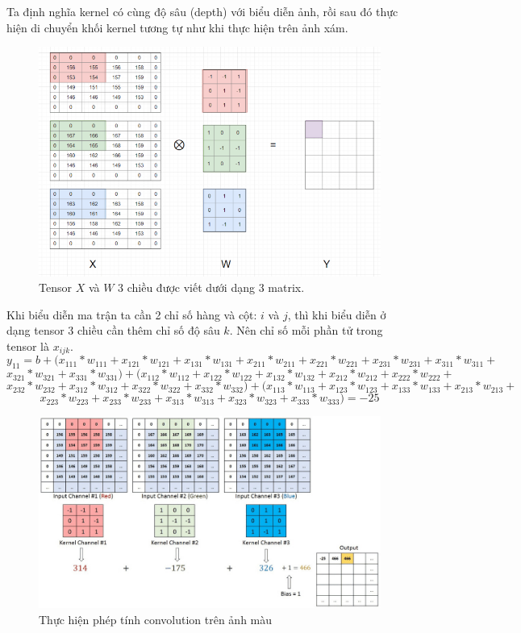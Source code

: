 Ta định nghĩa kernel có cùng độ sâu (depth) với biểu diễn ảnh, rồi sau đó thực hiện di chuyển khối kernel tương tự như khi thực hiện trên ảnh xám.

\FloatBarrier
\begin{figure}[htp]
\begin{center}
\includegraphics[scale=1]{chap2/c2_figs/14.png}
\end{center}
\caption{Tensor $X$ và $W$ 3 chiều được viết dưới dạng 3 matrix.}
\label{fig:padding,stride}
\end{figure}
\FloatBarrier

Khi biểu diễn ma trận ta cần 2 chỉ số hàng và cột: $i$ và $j$, thì khi biểu diễn ở dạng tensor 3 chiều cần thêm chỉ số độ sâu $k$. Nên chỉ số mỗi phần tử trong tensor là $x_{ijk}$.
$$y_{11} = b + (x_{111}*w_{111} +  x_{121}*w_{121} + x_{131}*w_{131} +  x_{211}*w_{211} +  x_{221}*w_{221} +  x_{231}*w_{231} +  x_{311}*w_{311} + $$ $$ x_{321}*w_{321} +  x_{331}*w_{331}) + (x_{112}*w_{112} +  x_{122}*w_{122} + x_{132}*w_{132} +  x_{212}*w_{212} +  x_{222}*w_{222} + $$ $$x_{232}*w_{232} +  x_{312}*w_{312} +  x_{322}*w_{322} +  x_{332}*w_{332}) +  (x_{113}*w_{113} +  x_{123}*w_{123} + x_{133}*w_{133} +  x_{213}*w_{213} + $$ $$ x_{223}*w_{223} +  x_{233}*w_{233} +  x_{313}*w_{313} +  x_{323}*w_{323} +  x_{333}*w_{333}) = -25$$

\FloatBarrier
\begin{figure}[htp]
\begin{center}
\includegraphics[scale=0.456]{chap2/c2_figs/8.jpg}
\end{center}
\caption{Thực hiện phép tính convolution trên ảnh màu}
\label{fig:padding,stride}
\end{figure}
\FloatBarrier

